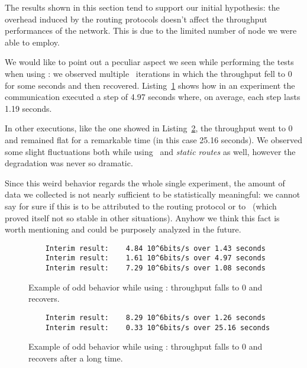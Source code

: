     The results shown in this section tend to support our initial
    hypothesis: the overhead induced by the routing protocols doesn't
    affect the throughput performances of the network. This is due to the
    limited number of node we were able to employ.

    We would like to point out a peculiar
    aspect we seen while performing the tests when using \olsr: we
    observed multiple \netperf\ iterations in which the throughput fell
    to 0 for some seconds and then recovered.
    Listing~\ref{lst:netperf-olsr-recover} shows how in an experiment the
    communication executed a step of 4.97 seconds where, on average, each
    step lasts 1.19 seconds.

    In other executions, like the one showed in
    Listing~\ref{lst:netperf-olsr-zero}, the throughput went to 0 and
    remained flat for a remarkable time (in this case 25.16 seconds).
    We observed some slight fluctuations both while using \batman\ and
    \emph{static routes} as well, however the degradation was never so
    dramatic.

    Since this weird behavior regards the whole single experiment, the
    amount of data we collected is not nearly sufficient to be
    statistically meaningful: we cannot say for sure if this
    is to be attributed to the routing protocol or to \netperf\ (which
    proved itself not so stable in other situations). Anyhow we
    think this fact is worth mentioning and could be purposely analyzed
    in the future.

    \begin{figure}[bthp]
    \begin{lstlisting}
    Interim result:    4.84 10^6bits/s over 1.43 seconds
    Interim result:    1.61 10^6bits/s over 4.97 seconds
    Interim result:    7.29 10^6bits/s over 1.08 seconds
    \end{lstlisting}
    \caption{Example of odd behavior while using \olsr: throughput falls
             to 0 and recovers.}
    \label{lst:netperf-olsr-recover}
    \end{figure}

    \begin{figure}[bthp]
    \begin{lstlisting}
    Interim result:    8.29 10^6bits/s over 1.26 seconds
    Interim result:    0.33 10^6bits/s over 25.16 seconds
    \end{lstlisting}
    \caption{Example of odd behavior while using \olsr: throughput falls
             to 0 and recovers after a long time.}
    \label{lst:netperf-olsr-zero}
    \end{figure}
